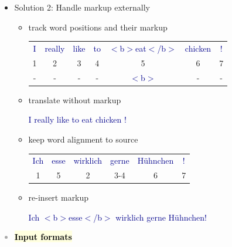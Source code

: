 \documentclass[landscape]{uedslides2C}
\newcommand{\example}[1]{\textcolor{darkblue}{\rm #1}}
\newcommand{\currenttopic}[1]{\colorbox{lightyellow}{\textcolor{black}{\bf #1}}}
\begin{document}
\begin{itemize}
\item Solution 2: Handle markup externally
\begin{itemize} \itemsep 5mm
\item track word positions and their markup
\begin{center}
\begin{tabular}{ccccccc}
\example{I} & \example{really} & \example{like} & \example{to} & \example{$<$b$>$eat$<$/b$>$} & \example{chicken} & \example{!} \\
1 & 2 & 3 & 4 & 5 & 6 & 7\\
-&-&-&-&\example{$<$b$>$}&-&-\\
\end{tabular}
\end{center}

\item translate without markup
\begin{center}
\example{I really like to eat chicken !}
\end{center}

\item keep word alignment to source
\begin{center}
\begin{tabular}{cccccc}
\example{Ich} & \example{esse} & \example{wirklich} & \example{gerne} & \example{H{\"u}hnchen} & \example{!} \\
1 & 5 & 2 & 3-4 & 6 & 7\\
\end{tabular}
\end{center}

\item re-insert markup
\begin{center}
\example{Ich $<$b$>$esse$<$/b$>$ wirklich gerne H{\"u}hnchen!}
\end{center}

\end{itemize}
\end{itemize}


\vspace{-5mm}
\textcolor{darkgrey}{
\begin{itemize} \itemsep -1mm
\item \currenttopic{Input formats}
\end{itemize}
}
\end{document}
